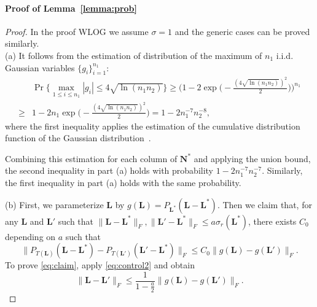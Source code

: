 \documentclass[12pt]{article}
\newcommand{\bL}{\boldsymbol{L}}
\newcommand{\bSigma}{\boldsymbol\Sigma}
\newcommand{\bU}{\boldsymbol{U}}
\newcommand{\bV}{\boldsymbol{V}}
\def\reals{\mathbb{R}}
\def\bSigma{\boldsymbol\Sigma}
\def\bU{\boldsymbol{U}}
\def\Col{\mathrm{Col}}
\def\bN{\boldsymbol{N}}
\theoremstyle{plain}
\theoremstyle{definition}
\theoremstyle{plain}
\theoremstyle{plain}
\theoremstyle{remark}
\begin{document}
\paragraph*{Proof of Lemma~\ref{lemma:prob}}
\begin{proof}
In the proof WLOG we assume $\sigma=1$ and the generic cases can be proved similarly.\\
 (a) It follows from the estimation of distribution of the maximum of $n_1$ i.i.d. Gaussian variables $\{g_i\}_{i=1}^{n_1}$:
\begin{align*}
&\Pr\{\max_{1\leq i\leq n_1}|g_i|\leq 4\sqrt{\ln (n_1n_2)}\}\geq \Big(1-2\exp\Big(-\frac{(4\sqrt{\ln (n_1n_2)})^2}{2}\Big)\Big)^{n_1}\\\geq& 1-2n_1\exp\Big(-\frac{(4\sqrt{\ln (n_1n_2)})^2}{2}\Big)=1-2n_1^{-7}n_2^{-8},
\end{align*}
where the first inequality applies the estimation of the cumulative distribution function of the Gaussian distribution~\cite[pg 8]{ledoux1991probability}.

Combining this estimation for each column of $\bN^*$ and applying the union bound, the second inequality in part (a) holds with probability $1-2n_1^{-7}n_2^{-7}$. Similarly, the first inequality in part (a) holds with the same probability.

(b) First, we parameterize $\bL$ by $g(\bL)=P_{\bL^*}(\bL-\bL^*)$. 
Then we claim that, for any $\bL$ and $\bL'$ such that $\|\bL-\bL^*\|_F, \|\bL'-\bL^*\|_F\leq a\sigma_r(\bL^*)$, there exists $C_0$ depending on $a$ such that
\begin{equation}\label{eq:claim}
\|P_{T(\bL)}(\bL-\bL^*)-P_{T(\bL')}(\bL'-\bL^*)\|_F\leq C_0 \|g(\bL)-g(\bL')\|_F.
\end{equation}
To prove \eqref{eq:claim}, apply \eqref{eq:control2} and obtain
\begin{equation}\label{eq:intermediate1}
\|\bL-\bL'\|_F\leq \frac{1}{1-\frac{a}{2}}\|g(\bL)-g(\bL')\|_F.
\end{equation}


\end{proof}
\end{document}
